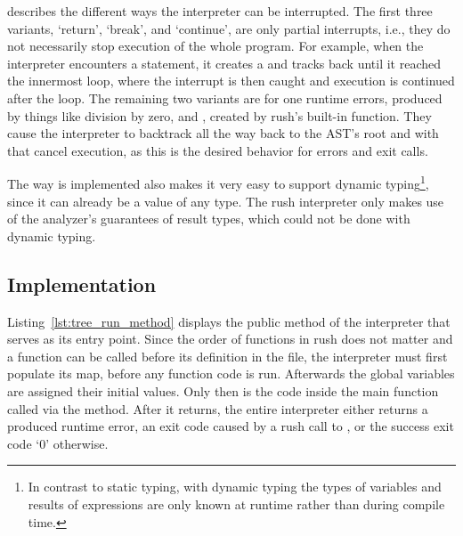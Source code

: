  describes the different ways the interpreter can be interrupted.
The first three variants, `return', `break', and `continue', are only partial interrupts, i.e., they do not necessarily stop execution of the whole program.
For example, when the interpreter encounters a  statement, it creates a  and tracks back until it reached the innermost loop, where the interrupt is then caught and execution is continued after the loop.
The remaining two variants are for one runtime errors, produced by things like division by zero, and , created by rush's built-in  function.
They cause the interpreter to backtrack all the way back to the AST's root and with that cancel execution, as this is the desired behavior for errors and exit calls.

The way  is implemented also makes it very easy to support dynamic typing\footnote{In contrast to static typing, with dynamic typing the types of variables and results of expressions are only known at runtime rather than during compile time.}, since it can already be a value of any type.
The rush interpreter only makes use of the analyzer's guarantees of result types, which could not be done with dynamic typing.

\subsection{Implementation}


Listing~\ref{lst:tree_run_method} displays the public  method of the interpreter that serves as its entry point.
Since the order of functions in rush does not matter and a function can be called before its definition in the file, the interpreter must first populate its  map, before any function code is run.
Afterwards the global variables are assigned their initial values.
Only then is the code inside the main function called via the  method.
After it returns, the entire interpreter either returns a produced runtime error, an exit code caused by a rush call to , or the success exit code `0' otherwise.


